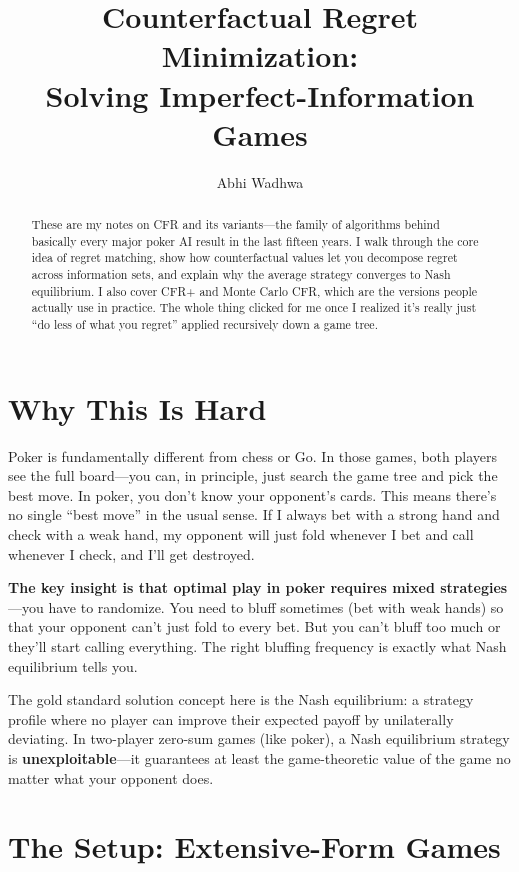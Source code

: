 \documentclass[11pt]{article}
\title{Counterfactual Regret Minimization:\\Solving Imperfect-Information Games}
\author{Abhi Wadhwa}
\date{}
\begin{document}
\maketitle

\begin{abstract}
These are my notes on CFR and its variants---the family of algorithms behind basically every major poker AI result in the last fifteen years. I walk through the core idea of regret matching, show how counterfactual values let you decompose regret across information sets, and explain why the average strategy converges to Nash equilibrium. I also cover CFR+ and Monte Carlo CFR, which are the versions people actually use in practice. The whole thing clicked for me once I realized it's really just ``do less of what you regret'' applied recursively down a game tree.
\end{abstract}

\section{Why This Is Hard}

Poker is fundamentally different from chess or Go. In those games, both players see the full board---you can, in principle, just search the game tree and pick the best move. In poker, you don't know your opponent's cards. This means there's no single ``best move'' in the usual sense. If I always bet with a strong hand and check with a weak hand, my opponent will just fold whenever I bet and call whenever I check, and I'll get destroyed.

\textbf{The key insight is that optimal play in poker requires mixed strategies}---you have to randomize. You need to bluff sometimes (bet with weak hands) so that your opponent can't just fold to every bet. But you can't bluff too much or they'll start calling everything. The right bluffing frequency is exactly what Nash equilibrium tells you.

The gold standard solution concept here is the Nash equilibrium: a strategy profile where no player can improve their expected payoff by unilaterally deviating. In two-player zero-sum games (like poker), a Nash equilibrium strategy is \textbf{unexploitable}---it guarantees at least the game-theoretic value of the game no matter what your opponent does.

\section{The Setup: Extensive-Form Games}
\end{document}
